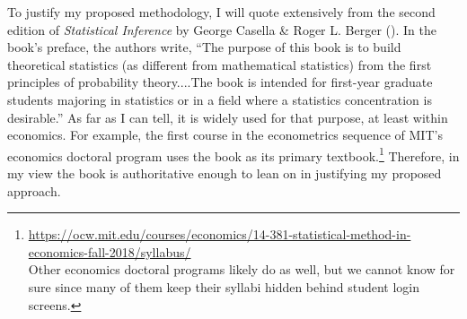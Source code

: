 \documentclass[english]{article}
\begin{document}
To justify my proposed methodology, I will quote extensively from
the second edition of \textit{Statistical Inference} by George Casella
\& Roger L. Berger (\cite{CasellaBerger2002}). In the book's preface,
the authors write, ``The purpose of this book is to build theoretical
statistics (as different from mathematical statistics) from the first
principles of probability theory....The book is intended for first-year
graduate students majoring in statistics or in a field where a statistics
concentration is desirable.'' As far as I can tell, it is widely
used for that purpose, at least within economics. For example, the
first course in the econometrics sequence of MIT's economics doctoral
program uses the book as its primary textbook.\footnote{\href{https://ocw.mit.edu/courses/economics/14-381-statistical-method-in-economics-fall-2018/syllabus/}{https://ocw.mit.edu/courses/economics/14-381-statistical-method-in-economics-fall-2018/syllabus/}\\
Other economics doctoral programs likely do as well, but we cannot
know for sure since many of them keep their syllabi hidden behind
student login screens.} Therefore, in my view the book is authoritative enough to lean on
in justifying my proposed approach.
\end{document}
